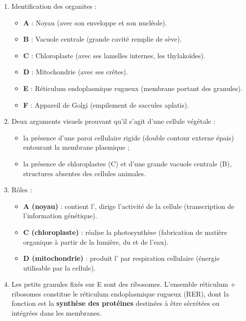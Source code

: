 \documentclass[11pt]{article}
\newcommand{\cle}[1]{{\popxbold\color{popdark}#1}}
\begin{document}
\begin{corrige}
\begin{enumerate}
    \item Identification des organites :
    \begin{itemize}
        \item \textbf{A} : Noyau (avec son enveloppe et son nucléole).
        \item \textbf{B} : Vacuole centrale (grande cavité remplie de sève).
        \item \textbf{C} : Chloroplaste (avec ses lamelles internes, les thylakoïdes).
        \item \textbf{D} : Mitochondrie (avec ses crêtes).
        \item \textbf{E} : Réticulum endoplasmique rugueux (membrane portant des granules).
        \item \textbf{F} : Appareil de Golgi (empilement de saccules aplatis).
    \end{itemize}
    \item Deux arguments visuels prouvant qu'il s'agit d'une cellule végétale :
    \begin{itemize}
        \item la présence d'une \cle{paroi cellulaire} rigide (double contour externe épais) entourant la membrane plasmique ;
        \item la présence de \cle{chloroplastes} (C) et d'une \cle{grande vacuole centrale} (B), structures absentes des cellules animales.
    \end{itemize}
    \item Rôles :
    \begin{itemize}
        \item \textbf{A (noyau)} : contient l', dirige l'activité de la cellule (transcription de l'information génétique).
        \item \textbf{C (chloroplaste)} : réalise la photosynthèse (fabrication de matière organique à partir de la lumière, du  et de l'eau).
        \item \textbf{D (mitochondrie)} : produit l' par respiration cellulaire (énergie utilisable par la cellule).
    \end{itemize}
    \item Les petits granules fixés sur E sont des \cle{ribosomes}. L'ensemble réticulum + ribosomes constitue le \cle{réticulum endoplasmique rugueux} (RER), dont la fonction est la \textbf{synthèse des protéines} destinées à être sécrétées ou intégrées dans les membranes.
\end{enumerate}
\end{corrige}
\end{document}
